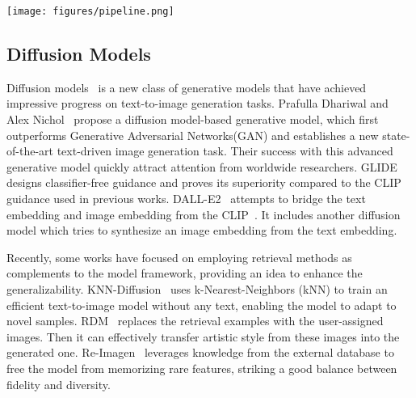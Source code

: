 \documentclass[10pt,twocolumn,letterpaper]{article}
\newcommand{\name}{ReMoDiffuse\xspace}
\begin{document}
\begin{figure*}[t]
    \centering
    \texttt{[image: figures/pipeline.png]}
    \caption{\textbf{Overview} of the proposed \name. a) Hybrid retrieval database stores various features of each training data. The pre-processed text feature and relative difference of motion length are sent to calculate the similarity with the given language description. The most similar ones are fed into the semantics-modulated transformer (SMT), serving as additional clues for motion generation. b) Semantics-modulated transformer incorporates  identical decoder layers, including a semantics-modulated attention (SMA) layer and an FFN layer. The figure shows the detailed architecture of SMA module. CLIP's extracted text features  from the given prompt, features  and  from the retrieved samples, and current motion features  will further refine the noised motion sequence.  c) To synthesize diverse and realistic motion sequences, starting from the pure noised sample, the motion transformer repeatedly eliminates the noise. To better mix outputs under different combinations of conditions, we suggest a training strategy to find the optimal hyper-parameters  and .}
    \label{fig:pipeline}
\end{figure*}

\subsection{Diffusion Models}

Diffusion models~\cite{ho2020denoising, nichol2021improved} is a new class of generative models that have achieved impressive progress on text-to-image generation tasks. Prafulla Dhariwal and Alex Nichol~\cite{dhariwal2021diffusion} propose a diffusion model-based generative model, which first outperforms Generative Adversarial Networks(GAN) and establishes a new state-of-the-art text-driven image generation task. Their success with this advanced generative model quickly attract attention from worldwide researchers. GLIDE~\cite{nichol2021glide} designs classifier-free guidance and proves its superiority compared to the CLIP guidance used in previous works. DALL-E2~\cite{ramesh2022hierarchical} attempts to bridge the text embedding and image embedding from the CLIP~\cite{radford2021learning}. It includes another diffusion model which tries to synthesize an image embedding from the text embedding. 

Recently, some works have focused on employing retrieval methods as complements to the model framework, providing an idea to enhance the generalizability. KNN-Diffusion~\cite{sheynin2022knn} uses k-Nearest-Neighbors (kNN) to train an efficient text-to-image model without any text, enabling the model to adapt to novel samples. RDM~\cite{blattmann2022retrieval} replaces the retrieval examples with the user-assigned images. Then it can effectively transfer artistic style from these images into the generated one. Re-Imagen~\cite{chen2022re} leverages knowledge from the external database to free the model from memorizing rare features, striking a good balance between fidelity and diversity. 
\end{document}
